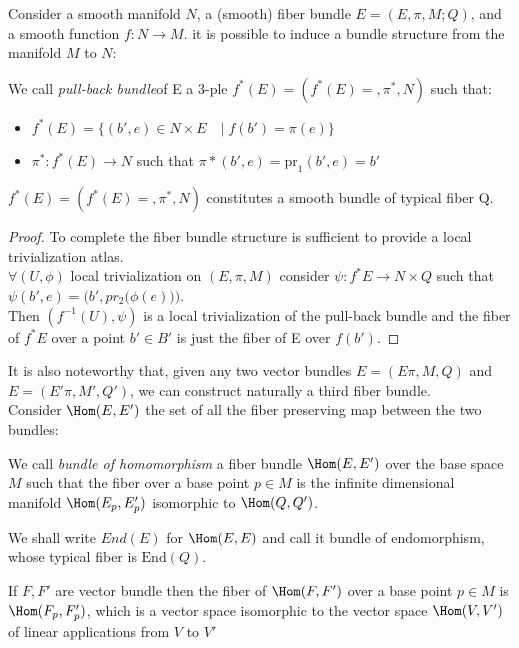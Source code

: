 \documentclass[Main]{subfiles}
\begin{document}
			Consider a smooth manifold $N$, a (smooth) fiber bundle $E=(E,\pi,M;Q)$, and a smooth function $f: N \rightarrow M$. it is possible to induce\cite{Husemoller} a bundle structure from the manifold $M$ to $N$:
			\begin{definition}
				We call \emph{pull-back bundle}of E a 3-ple $f^* (E) = (f^* (E) =, \pi^*,N)$ such that:
				\begin{itemize}
					\item $f^* (E) =  \big\{ (b',e) \in N \times E \quad \big\vert \; f(b') = \pi(e) \big\} $
					\item $\pi^*:f^* (E) \rightarrow N $ such that $ \pi* (b',e) = \textrm{pr}_1 (b',e)= b' $
				\end{itemize}
			\end{definition}
			\begin{proposition}
				$f^* (E) = (f^* (E) =, \pi^*,N)$ constitutes a smooth bundle of typical fiber Q.
			\end{proposition}
			\begin{proof}
				To complete the fiber bundle structure is sufficient to provide a local trivialization atlas.
				\\
				$\forall ( U, \phi)$ local trivialization on $(E, \pi, M)$  consider $\psi: f^* E \rightarrow N \times Q$ such that $\psi( b',e) = \bigg( b', pr_2 \big( \phi(e)\big)\bigg)$.
				\\
				Then $(f^{-1}(U),\psi)$ is a local trivialization of the pull-back bundle and the fiber of $f^*E$ over a point $b'\in B'$  is just the fiber of E over $f(b')$.
			\end{proof}

			
			It is also noteworthy that, given any two vector bundles $E =(E\pi,M,Q)$ and $E =(E'\pi,M',Q')$, we can construct 	naturally a third fiber bundle.\\
			Consider $\Hom(E,E')$ the set of all the fiber preserving map between the two bundles:
			\begin{definition}
				We call \emph{bundle of homomorphism} a fiber bundle $\Hom(E,E')$ over the base space $M$ such that the fiber over a base point $p\in M$ is the infinite dimensional manifold $\Hom(E_p,E'_p)$ isomorphic to $\Hom(Q,Q')$.
			\end{definition}
			\begin{notationfix}
				We shall write $End(E)$ for $\Hom(E,E)$ and call it bundle of endomorphism, whose typical fiber is $\textrm{End}(Q)$.
			\end{notationfix}
			\begin{remark}
				If $F,F'$ are vector bundle then the fiber of  $\Hom(F,F')$ over a base point $p\in M$ is $\Hom(F_p,F'_p)$, which is a vector space isomorphic to the vector space $\Hom(V,V')$ of linear applications from $V$ to $V'$
			\end{remark}
	
\end{document}
